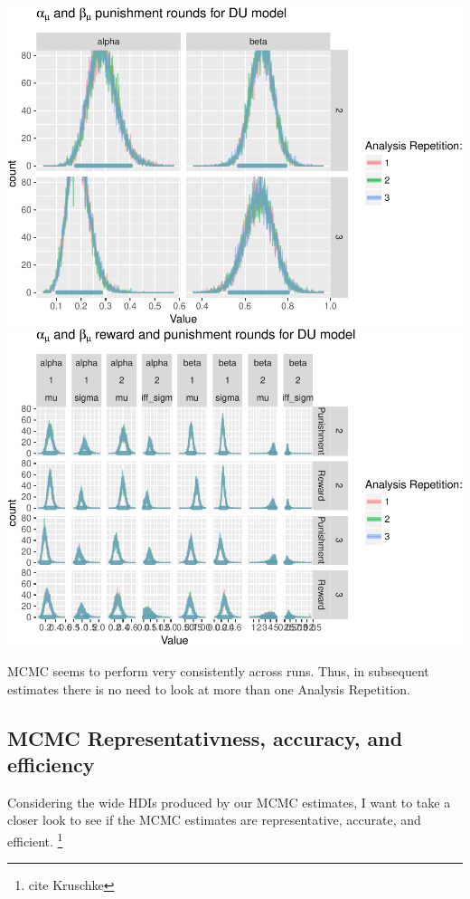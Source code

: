 \documentclass[]{article}
\let\rmarkdownfootnote\footnote%
\def\footnote{\protect\rmarkdownfootnote}
\begin{document}
\includegraphics{compare_vb_and_MCMC_files/figure-latex/MCMCReliability-1.pdf}
\includegraphics{compare_vb_and_MCMC_files/figure-latex/MCMCReliability-2.pdf}

MCMC seems to perform very consistently across runs. Thus, in subsequent
estimates there is no need to look at more than one Analysis Repetition.

\subsection{MCMC Representativness, accuracy, and
efficiency}\label{mcmc-representativness-accuracy-and-efficiency}

Considering the wide HDIs produced by our MCMC estimates, I want to take
a closer look to see if the MCMC estimates are representative, accurate,
and efficient. \footnote{cite Kruschke}
\end{document}
